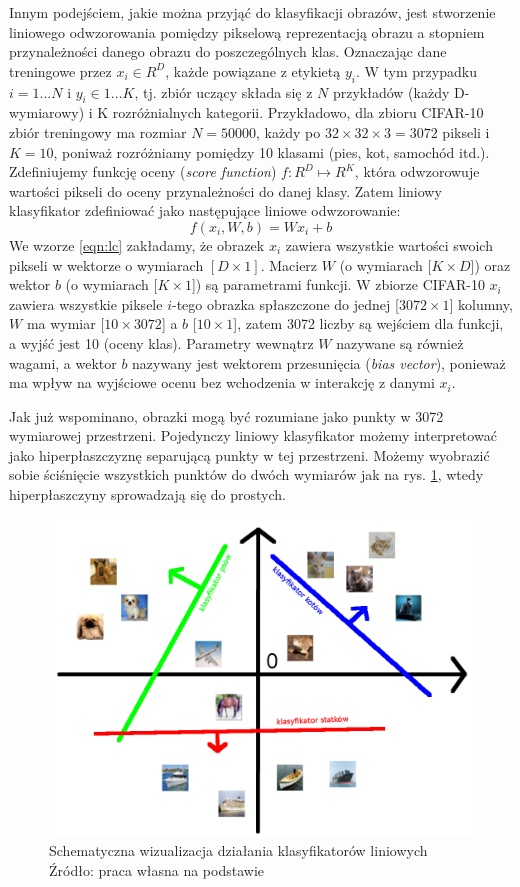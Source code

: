 Innym podejściem, jakie można przyjąć do klasyfikacji obrazów, jest stworzenie liniowego odwzorowania pomiędzy pikselową reprezentacją obrazu a stopniem przynależności danego obrazu do poszczególnych klas.
Oznaczając dane treningowe przez $x_i \in R^D$, każde powiązane z etykietą $y_i$.
W tym przypadku $i = 1 ... N$ i $y_i \in 1 ... K$, tj. zbiór uczący składa się z $N$ przykładów (każdy D-wymiarowy) i K rozróżnialnych kategorii.
Przykładowo, dla zbioru CIFAR-10 zbiór treningowy ma rozmiar $N = 50000$, każdy po $32 \times 32 \times 3 = 3072$ pikseli i $K = 10$, poniważ rozróżniamy pomiędzy 10 klasami (pies, kot, samochód itd.).
Zdefiniujemy funkcję oceny (\textit{score function}) $f : R^D \mapsto R^K$, która odwzorowuje wartości pikseli do oceny przynależności do danej klasy.
Zatem liniowy klasyfikator zdefiniować jako następujące liniowe odwzorowanie:
\begin{equation}\label{eqn:lc}
f(x_i,W,b) = Wx_i + b
\end{equation}
We wzorze \ref{eqn:lc} zakładamy, że obrazek $x_i$ zawiera wszystkie wartości swoich pikseli w wektorze o wymiarach $[D \times 1]$.
Macierz $W$ (o wymiarach $[K \times D$]) oraz wektor $b$ (o wymiarach [$K \times 1$]) są parametrami funkcji.
W zbiorze CIFAR-10 $x_i$ zawiera wszystkie piksele $i$-tego obrazka spłaszczone do jednej [$3072 \times 1$] kolumny, $W$ ma wymiar [$10 \times 3072$] a $b$ [$10 \times 1$], zatem 3072 liczby są wejściem dla funkcji, a wyjść jest 10 (oceny klas).
Parametry wewnątrz $W$ nazywane są również wagami, a wektor $b$ nazywany jest wektorem przesunięcia (\textit{bias vector}), ponieważ ma wpływ na wyjściowe ocenu bez wchodzenia w interakcję z danymi $x_i$. \cite{cs231n}

Jak już wspominano, obrazki mogą być rozumiane jako punkty w 3072 wymiarowej przestrzeni.
Pojedynczy liniowy klasyfikator możemy interpretować jako hiperpłaszczyznę separującą punkty w tej przestrzeni.
Możemy wyobrazić sobie ściśnięcie wszystkich punktów do dwóch wymiarów jak na rys. \ref{fig:cartoon_class}, wtedy hiperpłaszczyny sprowadzają się do prostych.

\begin{figure}[h!tb]
	 \centering
	 \includegraphics[width = 0.75\linewidth]{img/klas_cartoon}
	 \caption{Schematyczna wizualizacja działania klasyfikatorów liniowych \\
              Źródło: praca własna na podstawie \cite{cs231n}}
	 \label{fig:cartoon_class}
\end{figure}

